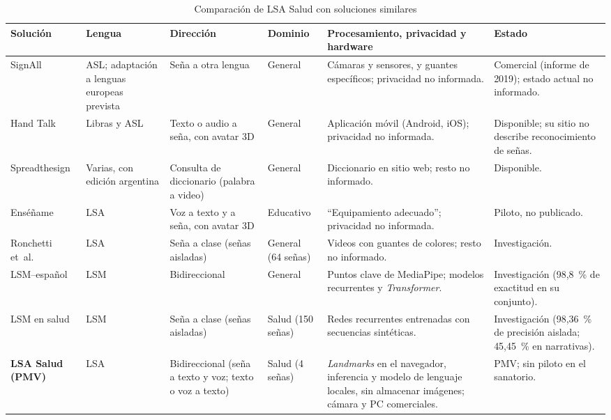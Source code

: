 \begin{table}[H]
  \centering
  \caption{Comparación de LSA Salud con soluciones similares}\label{tab:similares}
  \footnotesize
  \setlength{\tabcolsep}{3pt}
  \begin{tabularx}{\textwidth}{>{\raggedright\arraybackslash}p{2.3cm} >{\raggedright\arraybackslash}p{1.6cm} >{\raggedright\arraybackslash}p{2.4cm} >{\raggedright\arraybackslash}p{1.9cm} >{\raggedright\arraybackslash}X >{\raggedright\arraybackslash}p{2.2cm}}
    \toprule
    \textbf{Solución} & \textbf{Lengua} & \textbf{Dirección} & \textbf{Dominio} & \textbf{Procesamiento, privacidad y hardware} & \textbf{Estado} \\
    \midrule
    SignAll \parencite{cordis2019signall} & ASL; adaptación a lenguas europeas prevista & Seña a otra lengua & General & Cámaras y sensores, y guantes específicos; privacidad no informada. & Comercial (informe de 2019); estado actual no informado. \\
    Hand Talk \parencite{handtalk} & Libras y ASL & Texto o audio a seña, con avatar 3D & General & Aplicación móvil (Android, iOS); privacidad no informada. & Disponible; su sitio no describe reconocimiento de señas. \\
    Spreadthesign \parencite{spreadthesign} & Varias, con edición argentina & Consulta de diccionario (palabra a video) & General & Diccionario en sitio web; resto no informado. & Disponible. \\
    Enséñame \parencite{quiroga2023ensename} & LSA & Voz a texto y a seña, con avatar 3D & Educativo & ``Equipamiento adecuado''; privacidad no informada. & Piloto, no publicado. \\
    Ronchetti et~al. \parencite{ronchetti2016bow,ronchetti2016lsa64} & LSA & Seña a clase (señas aisladas) & General (64 señas) & Videos con guantes de colores; resto no informado. & Investigación. \\
    LSM--español \parencite{gonzalez2024msl} & LSM & Bidireccional & General & Puntos clave de MediaPipe; modelos recurrentes y \emph{Transformer}. & Investigación (98,8~\% de exactitud en su conjunto). \\
    LSM en salud \parencite{becerril2025msl} & LSM & Seña a clase (señas aisladas) & Salud (150 señas) & Redes recurrentes entrenadas con secuencias sintéticas. & Investigación (98,36~\% de precisión aislada; 45,45~\% en narrativas). \\
    \midrule
    \textbf{LSA Salud (PMV)} & LSA & Bidireccional (seña a texto y voz; texto o voz a texto) & Salud (4 señas) & \emph{Landmarks} en el navegador, inferencia y modelo de lenguaje locales, sin almacenar imágenes; cámara y PC comerciales. & PMV; sin piloto en el sanatorio. \\
    \bottomrule
  \end{tabularx}
\end{table}

